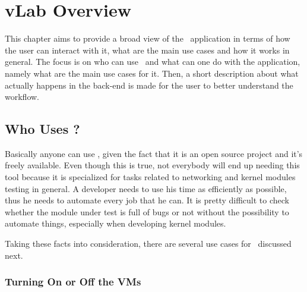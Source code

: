 \chapter{vLab Overview}
\label{chapter:Chapter 3}


This chapter aims to provide a broad view of the \project\ application in terms of how the user can interact with it, what are the main use cases and how it works in general.
The focus is on who can use \project\ and what can one do with the application, namely what are the main use cases for it.
Then, a short description about what actually happens in the back-end is made for the user to better understand the workflow.

\section{Who Uses \project?}
\label{sec:who-uses-vlab}

Basically anyone can use \project, given the fact that it is an open source project and it's freely available.
Even though this is true, not everybody will end up needing this tool because it is specialized for tasks related to networking and kernel modules testing in general.
A developer needs to use his time as efficiently as possible, thus he needs to automate every job that he can.
It is pretty difficult to check whether the module under test is full of bugs or not without the possibility to automate things, especially when developing kernel modules.

Taking these facts into consideration, there are several use cases for \project\ discussed next.

\subsection{Turning On or Off the VMs}
\label{sub-sec:turning-on-off-vms}


